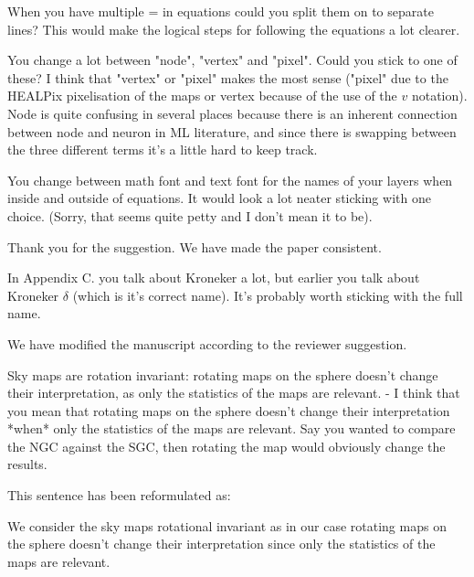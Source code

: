 \documentclass[12pt,a4paper]{article}
\newcommand{\nati}[1]{{\color[rgb]{.1,.6,.1}{NP: #1}}}
\newcommand{\todo}[1]{{\color[rgb]{.6,.1,.6}{TODO: #1}}}
\newcommand{\1}{\b{1}}              %
\newcommand{\0}{\b{0}}              %
\begin{document}
\begin{mdframed}[style=comment] 
When you have multiple = in equations could you split them on to separate lines? This would make the logical steps for following the equations a lot clearer.
\end{mdframed}
\todo{Assigned: @tomek}
\nati{I personally think it is better without separating the lines}

\begin{mdframed}[style=comment] 
You change a lot between "node", "vertex" and "pixel". Could you stick to one of these? I think that "vertex" or "pixel" makes the most sense ("pixel" due to the HEALPix pixelisation of the maps or vertex because of the use of the $v$ notation). Node is quite confusing in several places because there is an inherent connection between node and neuron in ML literature, and since there is swapping between the three different terms it's a little hard to keep track.
\end{mdframed}
\todo{Assigned: @all}
\nati{What do you think? This avoid repetition. But we could be more consistent...}


\begin{mdframed}[style=comment] 
You change between math font and text font for the names of your layers when inside and outside of equations. It would look a lot neater sticking with one choice. (Sorry, that seems quite petty and I don't mean it to be).
\end{mdframed}
Thank you for the suggestion. We have made the paper consistent.
\nati{@all, when you read the paper, please check that I did not forget some of them. Every layer has been changed to math symbols as we use them like function. For example, SM becomes $SM$.}

\begin{mdframed}[style=comment] 
In Appendix C. you talk about Kroneker a lot, but earlier you talk about Kroneker $\delta$ (which is it's correct name). It's probably worth sticking with the full name.
\end{mdframed}
We have modified the manuscript according to the reviewer suggestion.

\begin{mdframed}[style=comment] 
Sky maps are rotation invariant: rotating maps on the sphere doesn’t change their interpretation, as only the statistics of the maps are relevant.
- I think that you mean that rotating maps on the sphere doesn't change their interpretation *when* only the statistics of the maps are relevant. Say you wanted to compare the NGC against the SGC, then rotating the map would obviously change the results.
\end{mdframed}
This sentence has been reformulated as:
\begin{mdframed}[style=manuscript] 
We consider the sky maps rotational invariant as in our case rotating maps on the sphere doesn't change their interpretation since only the statistics of the maps are relevant.
\end{mdframed}
\end{document}
